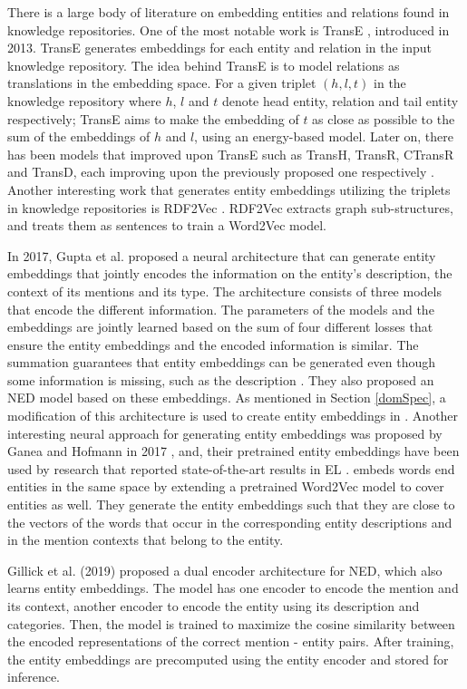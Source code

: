 \documentclass{article}
\theoremstyle{definition}
\theoremstyle{remark}
\begin{document}
There is a large body of literature on embedding entities and relations found in knowledge repositories. One of the most notable work is TransE \cite{TransE}, introduced in 2013. TransE generates embeddings for each entity and relation in the input knowledge repository. The idea behind TransE is to model relations as translations in the embedding space. For a given triplet $(h,l,t)$ in the knowledge repository where $h$, $l$ and $t$ denote head entity, relation and tail entity respectively; TransE aims to make the embedding of $t$ as close as possible to the sum of the embeddings of $h$ and $l$, using an energy-based model. Later on, there has been models that improved upon TransE such as TransH, TransR, CTransR and TransD, each improving upon the previously proposed one respectively  \cite{TransEimproved}. Another interesting work that generates entity embeddings utilizing the triplets in knowledge repositories is RDF2Vec \cite{RDF2Vec}. RDF2Vec extracts graph sub-structures, and treats them as sentences to train a Word2Vec \cite{w2v} model. 
 
In 2017, Gupta et al. proposed a neural architecture that can generate entity embeddings that jointly encodes the information on the entity's description, the context of its mentions and its type. The architecture consists of three models that encode the different information. The parameters of the models and the embeddings are jointly learned based on the sum of four different losses that ensure the entity embeddings and the encoded information is similar. The summation guarantees that entity embeddings can be generated even though some information is missing, such as the description \cite{gupta}. They also proposed an NED model based on these embeddings.  As mentioned in Section \ref{domSpec}, a modification of this architecture is used to create entity embeddings in \cite{cosmetic}. Another interesting neural approach for generating entity embeddings was proposed by Ganea and Hofmann in 2017 \cite{kolitsasEmbed}, and, their pretrained entity embeddings have been used by research that reported state-of-the-art results in EL \cite{REL, kolitsas}. \cite{kolitsasEmbed} embeds words end entities in the same space by extending a pretrained Word2Vec model \cite{w2v} to cover entities as well. They generate the entity embeddings such that they are close to the vectors of the words that occur in the corresponding entity descriptions and in the mention contexts that belong to the entity.  

Gillick et al. (2019) \cite{googleintern} proposed a dual encoder architecture for NED, which also learns entity embeddings. The model has one encoder to encode the mention and its context, another encoder to encode the entity using its description and categories. Then, the model is trained to maximize the cosine similarity between the encoded representations of the correct mention - entity pairs. After training, the entity embeddings are precomputed using the entity encoder and stored for inference. 
\end{document}

